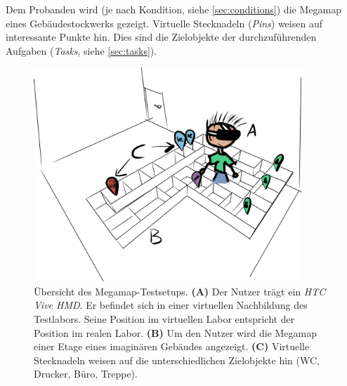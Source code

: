 \documentclass[
    draft=false,
    paper=a4,
    fontsize=12pt,
    twoside=false,
    captions=tableheading,
    british, ngerman,
]{scrartcl}
\begin{document}
Dem Probanden wird (je nach Kondition, siehe \autoref{sec:conditions}) die Megamap eines Gebäudestockwerks gezeigt.
Virtuelle Stecknadeln (\emph{Pins}) weisen auf interessante Punkte hin.
Dies sind die Zielobjekte der durchzuführenden Aufgaben (\emph{Tasks}, siehe \autoref{sec:tasks}).
\begin{figure}[p]
    \centering
    \includegraphics[width=0.9\textwidth]{study_design_setup_reworked}
    \caption{Übersicht des Megamap-Testsetups. %
    \textbf{(A)} Der Nutzer trägt ein \emph{HTC Vive HMD}. %
    Er befindet sich in einer virtuellen Nachbildung des Testlabors. %
    Seine Position im virtuellen Labor entspricht der Position im realen Labor. %
    \textbf{(B)} Um den Nutzer wird die Megamap einer Etage eines imaginären Gebäudes angezeigt. %
    \textbf{(C)} Virtuelle Stecknadeln weisen auf die unterschiedlichen Zielobjekte hin (WC, Drucker, Büro, Treppe).}
    \label{fig:study_design_rework}
\end{figure}

\end{document}
